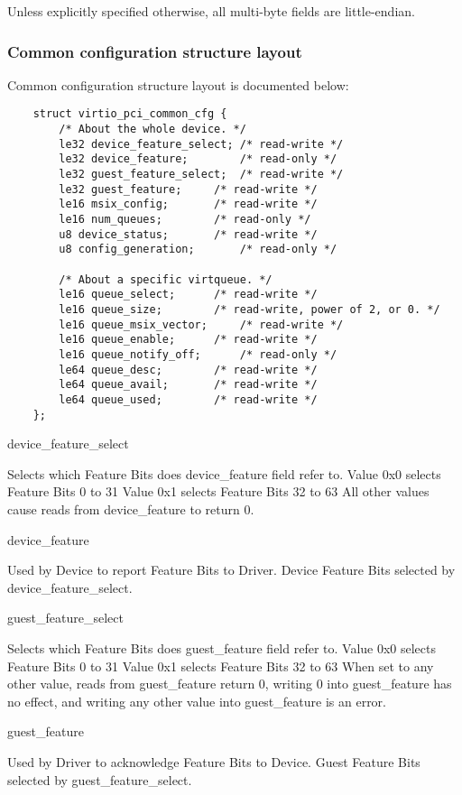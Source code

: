 Unless explicitly specified otherwise, all multi-byte fields are little-endian.

\subsubsection{Common configuration structure layout}\label{sec:Virtio Transport Options / Virtio Over PCI Bus / PCI Device Layout / Common configuration structure layout}
Common configuration structure layout is documented below:

\begin{lstlisting}
	struct virtio_pci_common_cfg {
		/* About the whole device. */
		le32 device_feature_select;	/* read-write */
		le32 device_feature;		/* read-only */
		le32 guest_feature_select;	/* read-write */
		le32 guest_feature;		/* read-write */
		le16 msix_config;		/* read-write */
		le16 num_queues;		/* read-only */
		u8 device_status;		/* read-write */
		u8 config_generation;		/* read-only */

		/* About a specific virtqueue. */
		le16 queue_select;		/* read-write */
		le16 queue_size;		/* read-write, power of 2, or 0. */
		le16 queue_msix_vector;		/* read-write */
		le16 queue_enable;		/* read-write */
		le16 queue_notify_off;		/* read-only */
		le64 queue_desc;		/* read-write */
		le64 queue_avail;		/* read-write */
		le64 queue_used;		/* read-write */
	};
\end{lstlisting}

device_feature_select

        Selects which Feature Bits does device_feature field refer to.
        Value 0x0 selects Feature Bits 0 to 31
        Value 0x1 selects Feature Bits 32 to 63
        All other values cause reads from device_feature to return 0.

device_feature

        Used by Device to report Feature Bits to Driver.
        Device Feature Bits selected by device_feature_select.

guest_feature_select

        Selects which Feature Bits does guest_feature field refer to.
        Value 0x0 selects Feature Bits 0 to 31
        Value 0x1 selects Feature Bits 32 to 63
        When set to any other value, reads from guest_feature
        return 0, writing 0 into guest_feature has no effect, and
        writing any other value into guest_feature is an error.

guest_feature

        Used by Driver to acknowledge Feature Bits to Device.
        Guest Feature Bits selected by guest_feature_select.

